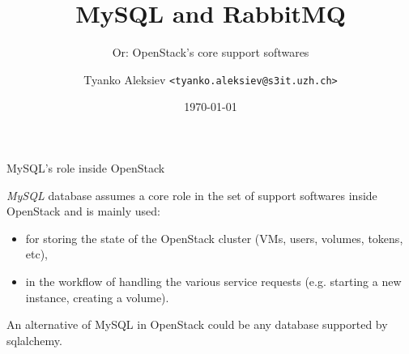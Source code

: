 \documentclass[english,serif,mathserif]{beamer}
\begin{document}
\title[Short Title]{MySQL and RabbitMQ} 
\subtitle{Or: OpenStack's core support softwares} 

\author{Tyanko Aleksiev \texttt{<tyanko.aleksiev@s3it.uzh.ch>}}

\date{\today}

\maketitle

\begin{frame}{MySQL's role inside OpenStack}

\textit{MySQL} database assumes a core role in the set of support softwares
inside OpenStack and is mainly used:

\begin{itemize}
\item for storing the state of the OpenStack cluster (VMs, users, volumes, tokens, etc), 
\item in the workflow of handling the various service requests (e.g. starting a new instance, creating a volume).
\end{itemize}

An alternative of MySQL in OpenStack could be any database supported by sqlalchemy.

\end{frame}
\end{document}
